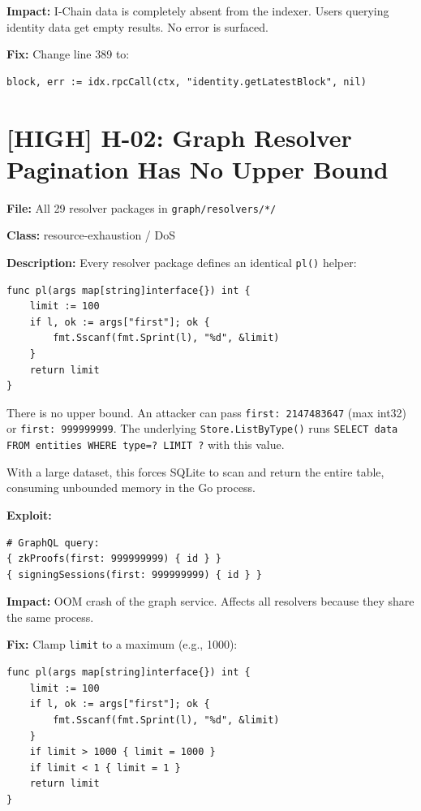 \documentclass{article}
\begin{document}
\textbf{Impact:} I-Chain data is completely absent from the indexer.
Users querying identity data get empty results. No error is surfaced.

\textbf{Fix:} Change line 389 to:
\begin{lstlisting}
block, err := idx.rpcCall(ctx, "identity.getLatestBlock", nil)
\end{lstlisting}


\section{[HIGH] H-02: Graph Resolver Pagination Has No Upper Bound}

\textbf{File:} All 29 resolver packages in \texttt{graph/resolvers/*/}

\textbf{Class:} resource-exhaustion / DoS

\textbf{Description:}
Every resolver package defines an identical \texttt{pl()} helper:
\begin{lstlisting}
func pl(args map[string]interface{}) int {
    limit := 100
    if l, ok := args["first"]; ok {
        fmt.Sscanf(fmt.Sprint(l), "%d", &limit)
    }
    return limit
}
\end{lstlisting}

There is no upper bound. An attacker can pass \texttt{first: 2147483647}
(max int32) or \texttt{first: 999999999}. The underlying
\texttt{Store.ListByType()} runs \texttt{SELECT data FROM entities WHERE
type=? LIMIT ?} with this value.

With a large dataset, this forces SQLite to scan and return the entire table,
consuming unbounded memory in the Go process.

\textbf{Exploit:}
\begin{lstlisting}
# GraphQL query:
{ zkProofs(first: 999999999) { id } }
{ signingSessions(first: 999999999) { id } }
\end{lstlisting}

\textbf{Impact:} OOM crash of the graph service. Affects all resolvers
because they share the same process.

\textbf{Fix:} Clamp \texttt{limit} to a maximum (e.g., 1000):
\begin{lstlisting}
func pl(args map[string]interface{}) int {
    limit := 100
    if l, ok := args["first"]; ok {
        fmt.Sscanf(fmt.Sprint(l), "%d", &limit)
    }
    if limit > 1000 { limit = 1000 }
    if limit < 1 { limit = 1 }
    return limit
}
\end{lstlisting}
\end{document}
